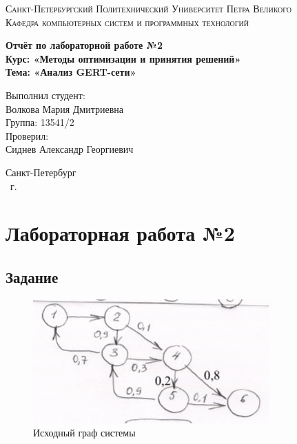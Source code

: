 \documentclass[14pt,a4paper,report]{report}
\begin{document}
\def\contentsname{Содержание}

\begin{titlepage}
	\begin{center}
		\textsc{Санкт-Петербургский Политехнический 
			Университет Петра Великого\\[5mm]
			Кафедра компьютерных систем и программных технологий}
		
		\vfill
		
		\textbf{Отчёт по лабораторной работе №2\\[3mm]
			Курс: «Методы оптимизации и принятия решений»\\[3mm]
			Тема: «Анализ GERT-сети»\\[35mm]
			}
	\end{center}
	
	\hfill
	\begin{minipage}{.5\textwidth}
		Выполнил студент:\\[2mm] 
		Волкова Мария Дмитриевна\\
		Группа: 13541/2\\[5mm]
		
		Проверил:\\[2mm] 
		Сиднев Александр Георгиевич
	\end{minipage}
	\vfill
	\begin{center}
		Санкт-Петербург\\ \the\year\ г.
	\end{center}
\end{titlepage}

\tableofcontents
\clearpage

\chapter{Лабораторная работа №2}

\section{Задание}

\begin{figure}[h!]
	\centering
	\includegraphics[scale = 1.5]{images/00.jpeg}
	\caption{Исходный граф системы}
	\label{image:0}
\end{figure}
\end{document}
